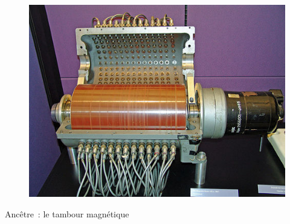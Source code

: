 \begin{frame}
\frametitle{\insertsubsection}
\vspace{-0.1cm}
\begin{figure}
  \includegraphics[width=0.8\linewidth]{fig3/magnetic-drum.jpeg}
 \end{figure}
\vspace{-0.1cm}
 Ancêtre~: le tambour magnétique
\end{frame}

